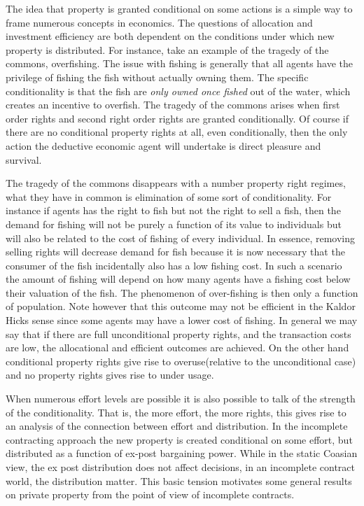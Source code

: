 \documentclass[12pt]{article}
\numberwithin{equation}{section}
\begin{document}
The idea that property is granted conditional on some actions is a simple way to frame numerous concepts in economics. The questions of allocation and investment efficiency are both dependent on the conditions under which new property is distributed. For instance, take an example of the tragedy of the commons, overfishing. The issue with fishing is generally that all agents have the privilege of fishing the fish without actually owning them. The specific conditionality is that the fish are \textit{only owned once fished} out of the water, which creates an incentive to overfish. The tragedy of the commons arises when first order rights and second right order rights are granted conditionally. Of course if there are no conditional property rights at all, even conditionally, then the only action the deductive economic agent will undertake is direct pleasure and survival.

The tragedy of the commons disappears with a number property right regimes, what they have in common is elimination of some sort of conditionality. For instance if agents has the right to fish but not the right to sell a fish, then the demand for fishing will not be purely a function of its value to individuals but will also be related to the cost of fishing of every individual. In essence, removing selling rights will decrease demand for fish because it is now necessary  that the consumer of the fish incidentally also has a low fishing cost. In such a scenario the amount of fishing will depend on how many agents have a fishing cost below their valuation of the fish. The phenomenon of over-fishing is then only a function of population. Note however that this outcome may not be efficient in the Kaldor Hicks sense since some agents may have a lower cost of fishing.  In general we may say that if there are full unconditional property rights, and the transaction costs are low, the allocational and efficient outcomes are achieved. On the other hand conditional property rights give rise to overuse(relative to the unconditional case) and no property rights gives rise to under usage.

When numerous effort levels are possible it is also possible to talk of the strength of the conditionality. That is, the more effort, the more rights, this gives rise to an analysis of the connection between effort and distribution. In the incomplete contracting approach the new property is created conditional on some effort, but distributed as a function of ex-post bargaining power. While in the static Coasian view, the ex post distribution does not affect decisions, in an incomplete contract world, the distribution matter. This basic tension motivates some general results on private property from the point of view of incomplete contracts.
\end{document}

